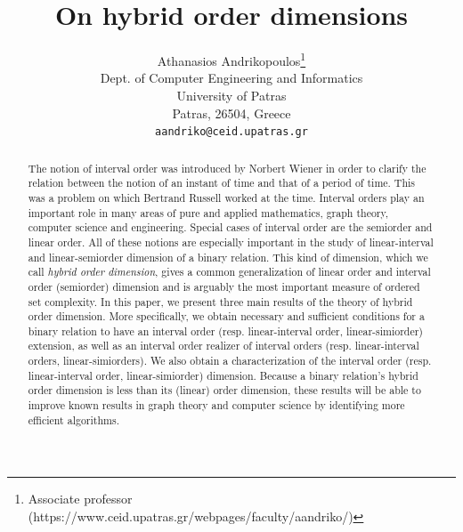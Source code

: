 \documentclass{article}
\title{On hybrid  order dimensions}
\author{
  Athanasios Andrikopoulos\thanks{Associate professor  (https://www.ceid.upatras.gr/webpages/faculty/aandriko/)} \\
  Dept. of Computer Engineering and Informatics\\
  University of Patras\\
  Patras, 26504, Greece \\
  \texttt{aandriko@ceid.upatras.gr} \\
}
\theoremstyle{definition}
\begin{document}
\maketitle

\begin{abstract}
The notion of interval order was introduced by Norbert Wiener \cite{wie}
in order to clarify the relation between the notion of an instant of time and that of a period of time. This was a problem
on which 
Bertrand
Russell \cite{rus} worked at the time.
Interval orders play
an important role in many areas of pure and applied mathematics, graph theory, computer science and engineering.
Special cases of interval order are the semiorder and linear order.
All of these notions 
are especially important in the study of linear-interval and linear-semiorder dimension of a binary relation. 
This kind of dimension, which we call {\it hybrid order dimension},
gives a common generalization of linear order and
interval order (semiorder) dimension and
is
arguably the most important measure of ordered set complexity. 
In this paper,
we present three main results of the theory of hybrid order dimension. More specifically, we obtain necessary and sufficient conditions for a binary relation to have an interval order (resp. linear-interval order, linear-simiorder) extension, 
as well as an interval order realizer of interval orders (resp. linear-interval orders, linear-simiorders).
We also obtain a characterization of the interval order (resp. linear-interval order, linear-simiorder) dimension.
Because a binary relation's hybrid order dimension is less than its (linear) order dimension, these results will be able to 
improve known results in graph theory and computer science by identifying more efficient algorithms.
\end{abstract}


\end{document}
